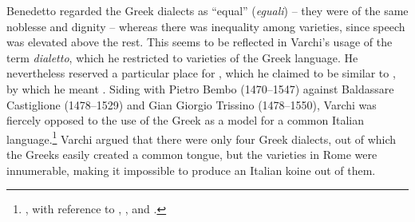 Benedetto \citet[95]{Varchi1570} regarded the Greek dialects as “equal” (\textit{eguali}) – they were of the same noblesse and dignity – whereas there was inequality among  varieties, since  speech was elevated above the rest. This seems to be reflected in Varchi’s usage of the term \textit{dialetto}, which he restricted to varieties of the Greek language. He nevertheless reserved a particular place for , which he claimed to be similar to , by which he meant  \citep[141]{Varchi1570}. Siding with Pietro Bembo (1470–1547) against Baldassare Castiglione (1478–1529) and Gian Giorgio Trissino (1478–1550), Varchi was fiercely opposed to the use of the Greek  as a model for a common Italian language.\footnote{\citet[269--271]{Varchi1570}, with reference to \citet{Bembo1525}, \citet{Castiglione1528}, and \citet{Trissino1529}.} Varchi argued that there were only four Greek dialects, out of which the Greeks easily created a common tongue, but the varieties in Rome were innumerable, making it impossible to produce an Italian koine out of them.

